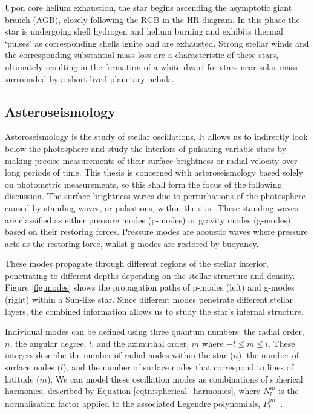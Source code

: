 Upon core helium exhaustion, the star begins ascending the asymptotic giant branch (AGB), closely following the RGB in the HR diagram. In this phase the star is undergoing shell hydrogen and helium burning and exhibits thermal `pulses' as corresponding shells ignite and are exhausted. Strong stellar winds and the corresponding substantial mass loss are a characteristic of these stars, ultimately resulting in the formation of a white dwarf for stars near solar mass surrounded by a short-lived planetary nebula.

\subsection{Asteroseismology}
\label{chap:intro:astero}
Asteroseismology is the study of stellar oscillations. It allows us to indirectly look below the photosphere and study the interiors of pulsating variable stars by making precise measurements of their surface brightness or radial velocity over long periods of time. This thesis is concerned with asteroseismology based solely on photometric measurements, so this shall form the focus of the following discussion. The surface brightness varies due to perturbations of the photosphere caused by standing waves, or pulsations, within the star. These standing waves are classified as either pressure modes (p-modes) or gravity modes (g-modes) based on their restoring forces. Pressure modes are acoustic waves where pressure acts as the restoring force, whilst g-modes are restored by buoyancy. 

These modes propagate through different regions of the stellar interior, penetrating to different depths depending on the stellar structure and density. Figure \ref{fig:modes} shows the propagation paths of p-modes (left) and g-modes (right) within a Sun-like star. Since different modes penetrate different stellar layers, the combined information allows us to study the star's internal structure.

Individual modes can be defined using three quantum numbers: the radial order, $n$, the angular degree, $l$, and the azimuthal order, $m$ where $-l \leq m \leq l$. These integers describe the number of radial nodes within the star ($n$), the number of surface nodes ($l$), and the number of surface nodes that correspond to lines of latitude ($m$). We can model these oscillation modes as combinations of spherical harmonics, described by Equation \ref{eqtn:spherical_harmonics}, where $N^m_l$ is the normalisation factor applied to the associated Legendre polynomials, $P^{|m|}_l$ \citep{handler_asteroseismology_2013}.

